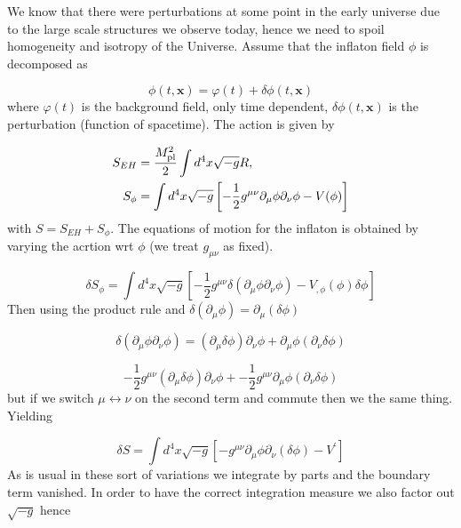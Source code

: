 We know that there were perturbations at some point in the early universe due to the large scale structures we observe today, hence we need to spoil homogeneity and isotropy of the Universe. Assume that the inflaton field $\phi$ is decomposed as

\begin{equation*}
    \phi(t, \bm{x}) = \varphi(t) + \delta \phi(t, \bm{x})
\end{equation*}
where $\varphi(t)$ is the background field, only time dependent, $\delta \phi(t, \bm{x})$ is the perturbation (function of spacetime). The action is given by

\begin{align}
    S_{EH} &= \frac{M_{\rm pl}^2}{2} \int d^4 x \sqrt{- g} R, \notag \\
    S_{\phi} &= \int d^4x \sqrt{-g} \left[ -\frac{1}{2} g^{\mu \nu} \partial_{\mu} \phi \partial_{\nu} \phi - V(\phi) \right] \label{eq: phi action}
\end{align}
with $S = S_{EH} + S_{\phi}$. The equations of motion for the inflaton is obtained by varying the acrtion wrt $\phi$ (we treat $g_{\mu \nu}$ as fixed).

\begin{equation*}
    \delta S_{\phi} = \int d^4 x \sqrt{-g} \left[ - \frac{1}{2} g^{\mu \nu} \delta(\partial_{\mu} \phi \partial_{\nu} \phi) - V_{, \phi}(\phi) \delta \phi \right]
\end{equation*}
Then using the product rule and $\delta (\partial_\mu \phi) = \partial_{\mu} (\delta \phi)$

\begin{equation*}
    \delta(\partial_{\mu} \phi \partial_{\nu} \phi) = (\partial_{\mu} \delta \phi) \partial_{\nu} \phi + \partial_{\mu} \phi (\partial_{\nu} \delta \phi)
\end{equation*}

\begin{equation*}
    -\frac{1}{2} g^{\mu \nu} (\partial_{\mu} \delta \phi) \partial_{\nu} \phi + -\frac{1}{2} g^{\mu \nu} \partial_{\mu} \phi (\partial_{\nu} \delta \phi)
\end{equation*}
but if we switch $\mu \leftrightarrow \nu$ on the second term and commute then we the same thing. Yielding

\begin{equation*}
    \delta S = \int d^4 x \sqrt{-g} [- g^{\mu \nu} \partial_{\mu} \phi \partial_{\nu} (\delta \phi) - V^{\prime}]
\end{equation*}
As is usual in these sort of variations we integrate by parts and the boundary term vanished. In order to have the correct integration measure we also factor out $\sqrt{-g}$ hence

